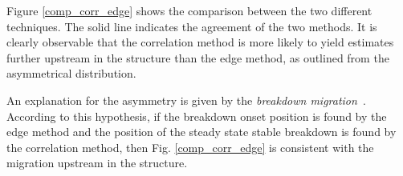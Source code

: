 Figure \ref{comp_corr_edge} shows the comparison between the two different techniques. The solid line indicates the agreement of the two methods. It is clearly observable that the correlation method is more likely to yield estimates further upstream in the structure than the edge method, as outlined from the asymmetrical distribution. 

An explanation for the asymmetry is given by the \textit{breakdown migration}~\cite{Woolley:2015,Jacewicz:CLICWS16,Degiovanni:migration}. According to this hypothesis, if the breakdown onset position is found by the edge method and the position of the steady state stable breakdown is found by the correlation method, then Fig. \ref{comp_corr_edge} is consistent with the migration upstream in the structure. 

\begin{figure}[p]
\centering
   \hspace{1mm}

\end{figure}
